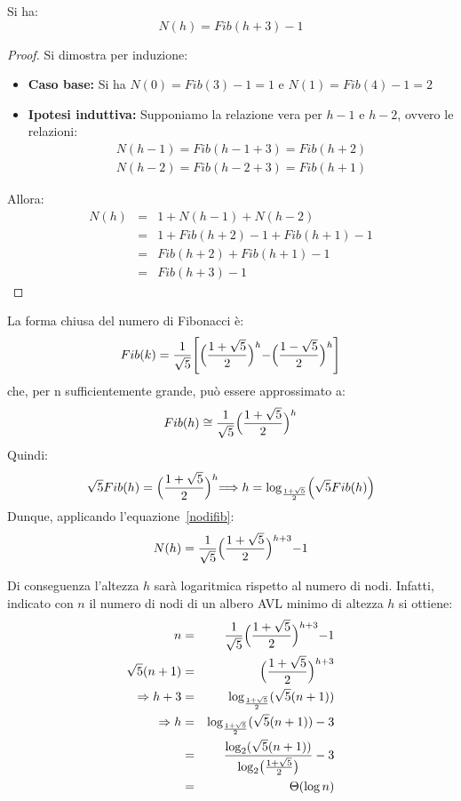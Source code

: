 \begin{propbox}
Si ha:
\begin{equation}\label{nodifib}
	N(h) = Fib(h+3)-1
\end{equation}
\end{propbox}
\begin{proof}
Si dimostra per induzione:
\begin{itemize}
	\item \textbf{Caso base:} Si ha $N(0)=Fib(3)-1=1$ e $N(1)=Fib(4)-1=2$
	\item \textbf{Ipotesi induttiva:} Supponiamo la relazione vera per $h-1$ e $h-2$, ovvero le relazioni:
	\begin{eqnarray*}
		N(h-1) = Fib(h-1+3) = Fib(h+2) \\
		N(h-2) = Fib(h-2+3) = Fib(h+1)
	\end{eqnarray*}
\end{itemize}
Allora:
\begin{eqnarray*}
	N(h) &=& 1+N(h-1)+N(h-2) \\
	&=& 1+ Fib(h+2) -1 + Fib(h+1)-1 \\
	&=& Fib(h+2)+ Fib(h+1)-1 \\
	&=& Fib(h+3)-1
\end{eqnarray*}
\end{proof}

La forma chiusa del numero di Fibonacci è:
\begin{displaymath}
Fib(k) = \frac{1}{\sqrt{5}} \Biggl [ \Bigl(\frac{1+\sqrt{5}}{2}\Bigl)^{h} - \Bigl(\frac{1-\sqrt{5}}{2}\Bigl)^{h} \Biggl]
\end{displaymath}
che, per n sufficientemente grande, può essere approssimato a:
\begin{displaymath}
Fib(h) \cong \frac{1}{\sqrt{5}} \Bigl (\frac{1+\sqrt{5}}{2}\Bigl)^{h}
\end{displaymath}
Quindi:
\begin{displaymath}
\sqrt{5}Fib(h) = \Bigl(\frac{1+\sqrt{5}}{2} \Bigl)^{h} \Longrightarrow h = \log_{\frac{1+\sqrt{5}}{2}}\Bigl(\sqrt{5}Fib(h)\Bigl)
\end{displaymath}
Dunque, applicando l'equazione~\ref{nodifib}:
\begin{displaymath}
N(h)= \frac{1}{\sqrt{5}} \Bigl( \frac{1+ \sqrt{5}}{2}\Bigl)^{h+3} -1
\end{displaymath}

Di conseguenza l'altezza $h$ sarà logaritmica rispetto al numero di nodi. Infatti, indicato con $n$ il numero di nodi di un albero \textsc{AVL} minimo di altezza $h$ si ottiene:
\begin{eqnarray*}
n &=& \frac{1}{\sqrt{5}} \Bigl( \frac{1+ \sqrt{5}}{2}\Bigl)^{h+3} -1 \\
\sqrt{5}(n+1) &=& \Bigl(\frac{1+\sqrt{5}}{2}\Bigl)^{h+3} \\
\Rightarrow  h+3 &=& \log_{\frac{1+\sqrt{5}}{2}} (\sqrt{5}(n+1)) \\
\Rightarrow  h &=& \log_{\frac{1+\sqrt{5}}{2}}(\sqrt{5}(n+1))-3 \\
&=& \frac{\log_{2}(\sqrt{5}(n+1))}{\log_{2}\bigl(\frac{1+\sqrt{5}}{2}\bigl)}-3 \\
&=& \Theta(\log n)
\end{eqnarray*}

